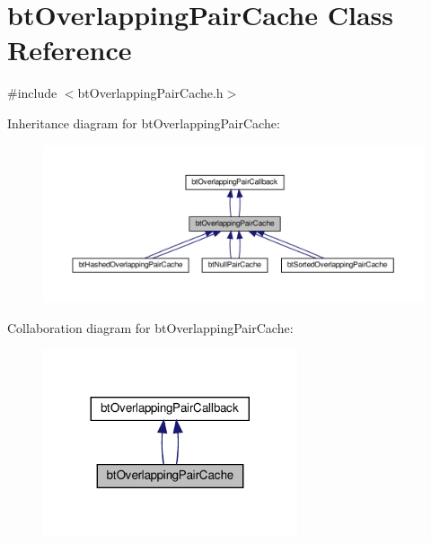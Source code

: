 \hypertarget{classbtOverlappingPairCache}{}\section{bt\+Overlapping\+Pair\+Cache Class Reference}
\label{classbtOverlappingPairCache}


{\ttfamily \#include $<$bt\+Overlapping\+Pair\+Cache.\+h$>$}



Inheritance diagram for bt\+Overlapping\+Pair\+Cache\+:
\nopagebreak
\begin{figure}[H]
\begin{center}
\leavevmode
\includegraphics[width=350pt]{classbtOverlappingPairCache__inherit__graph}
\end{center}
\end{figure}


Collaboration diagram for bt\+Overlapping\+Pair\+Cache\+:
\nopagebreak
\begin{figure}[H]
\begin{center}
\leavevmode
\includegraphics[width=212pt]{classbtOverlappingPairCache__coll__graph}
\end{center}
\end{figure}
